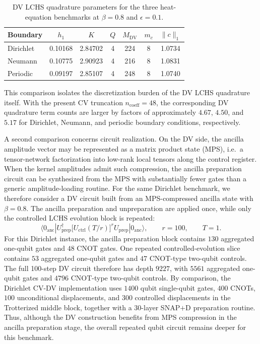 \begin{table}[h]
\centering
{\small
\caption{DV LCHS quadrature parameters for the three heat-equation benchmarks at $\beta=0.8$ and $\epsilon=0.1$.}
\label{tab:dv_resource_compare}
\begin{tabular}{lcccccc}
\toprule
Boundary & $h_1$ & $K$ & $Q$ & $M_{\mathrm{DV}}$ & $m_c$ & $\|c\|_1$ \\
\midrule
Dirichlet & 0.10168 & 2.84702 & 4 & 224 & 8 & 1.0734 \\
Neumann & 0.10775 & 2.90923 & 4 & 216 & 8 & 1.0831 \\
Periodic & 0.09197 & 2.85107 & 4 & 248 & 8 & 1.0740 \\
\bottomrule
\end{tabular}}
\end{table}

This comparison isolates the discretization burden of the DV LCHS quadrature itself. With the present CV truncation $n_{\mathrm{coeff}}=48$, the corresponding DV quadrature term counts are larger by factors of approximately $4.67$, $4.50$, and $5.17$ for Dirichlet, Neumann, and periodic boundary conditions, respectively.

A second comparison concerns circuit realization. On the DV side, the ancilla amplitude vector may be represented as a matrix product state (MPS), i.e.\ a tensor-network factorization into low-rank local tensors along the control register. When the kernel amplitudes admit such compression, the ancilla preparation circuit can be synthesized from the MPS with substantially fewer gates than a generic amplitude-loading routine. For the same Dirichlet benchmark, we therefore consider a DV circuit built from an MPS-compressed ancilla state with $\beta=0.8$. The ancilla preparation and unpreparation are applied once, while only the controlled LCHS evolution block is repeated:
\[
\langle 0_{\mathrm{anc}}|
U_{\mathrm{prep}}^\dagger
\bigl[U_{\mathrm{ctrl}}(T/r)\bigr]^r
U_{\mathrm{prep}}
|0_{\mathrm{anc}}\rangle,
\qquad r=100,
\qquad T=1.
\]
For this Dirichlet instance, the ancilla preparation block contains $130$ aggregated one-qubit gates and $48$ CNOT gates. One repeated controlled-evolution slice contains $53$ aggregated one-qubit gates and $47$ CNOT-type two-qubit controls. The full 100-step DV circuit therefore has depth $9227$, with $5561$ aggregated one-qubit gates and $4796$ CNOT-type two-qubit controls. By comparison, the Dirichlet CV-DV implementation uses $1400$ qubit single-qubit gates, $400$ CNOTs, $100$ unconditional displacements, and $300$ controlled displacements in the Trotterized middle block, together with a $30$-layer SNAP$+$D preparation routine. Thus, although the DV construction benefits from MPS compression in the ancilla preparation stage, the overall repeated qubit circuit remains deeper for this benchmark.

